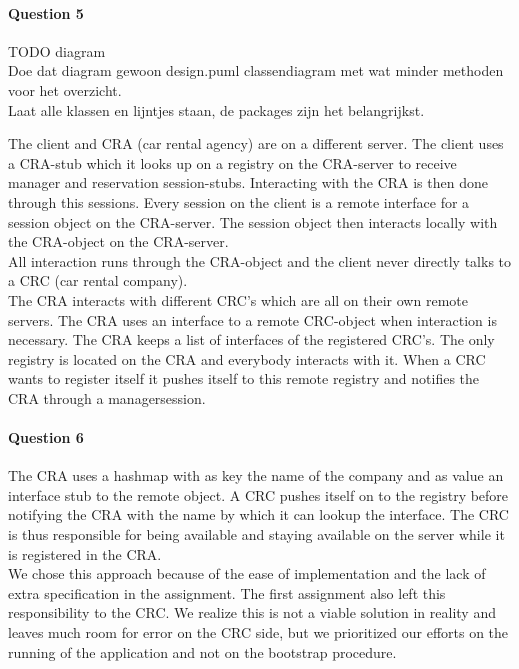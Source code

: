 \documentclass{ds-report}
\begin{document}
	\paragraph{Question 5} TODO diagram~\\
	Doe dat diagram gewoon design.puml classendiagram met wat minder methoden voor het overzicht.\\
	
	Laat alle klassen en lijntjes staan, de packages zijn het belangrijkst.
	
	
	The client and CRA (car rental agency) are on a different server. The client uses a CRA-stub which it looks up on a registry on the CRA-server to receive manager and reservation session-stubs. Interacting with the CRA is then done through this sessions. Every session on the client is a remote interface for a session object on the CRA-server. The session object then interacts locally with the CRA-object on the CRA-server. \\
	
	All interaction runs through the CRA-object and the client never directly talks to a CRC (car rental company). \\
	
	The CRA interacts with different CRC's which are all on their own remote servers. The CRA uses an interface to a remote CRC-object when interaction is necessary. The CRA keeps a list of interfaces of the registered CRC's. The only registry is located on the CRA and everybody interacts with it. When a CRC wants to register itself it pushes itself to this remote registry and notifies the CRA through a managersession. 
	
	\paragraph{Question 6} 
	The CRA uses a hashmap with as key the name of the company and as value an interface stub to the remote object. A CRC pushes itself on to the registry before notifying the CRA with the name by which it can lookup the interface. The CRC is thus responsible for being available and staying available on the server while it is registered in the CRA.\\
	
	We chose this approach because of the ease of implementation and the lack of extra specification in the assignment.
	The first assignment also left this responsibility to the CRC.
	We realize this is not a viable solution in reality and leaves much room for error on the CRC side, but we prioritized our efforts on the running of the application and not on the bootstrap procedure.
	
\end{document}
